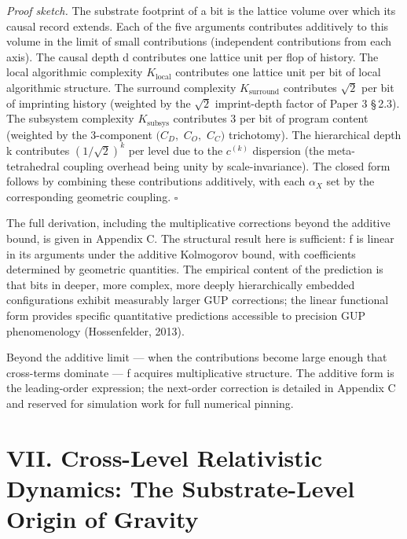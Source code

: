 \documentclass[11pt,oneside]{report}
\theoremstyle{definition}
\theoremstyle{remark}
\begin{document}
\emph{Proof sketch.} The substrate footprint of a bit is the lattice
volume over which its causal record extends. Each of the five arguments
contributes additively to this volume in the limit of small
contributions (independent contributions from each axis). The causal
depth d contributes one lattice unit per flop of history. The local
algorithmic complexity \ensuremath{K_{\mathrm{local}}} contributes one lattice unit per bit of
local algorithmic structure. The surround complexity \ensuremath{K_{\mathrm{surround}}}
contributes \ensuremath{\sqrt{2}} per bit of imprinting history (weighted by the \ensuremath{\sqrt{2}}
imprint-depth factor of Paper 3 \S\,2.3). The subsystem complexity
\ensuremath{K_{\mathrm{subsys}}} contributes 3 per bit of program content (weighted by the
3-component \ensuremath{(C_{D},} \ensuremath{C_{O},} \ensuremath{C_{C})} trichotomy). The hierarchical depth k
contributes \ensuremath{(1/\sqrt{2})^{k}} per level due to the \ensuremath{c^{(k)}} dispersion
(the meta-tetrahedral coupling overhead being unity by scale-invariance). The closed form
follows by combining these contributions additively, with each \ensuremath{\alpha_{X}} set
by the corresponding geometric coupling. \hfill\ensuremath{\square}

The full derivation, including the multiplicative corrections beyond the
additive bound, is given in Appendix C. The structural result here is
sufficient: f is linear in its arguments under the additive Kolmogorov
bound, with coefficients determined by geometric quantities. The
empirical content of the prediction is that bits in deeper, more
complex, more deeply hierarchically embedded configurations exhibit
measurably larger GUP corrections; the linear functional form provides
specific quantitative predictions accessible to precision GUP
phenomenology (Hossenfelder, 2013).

Beyond the additive limit --- when the contributions become large enough
that cross-terms dominate --- f acquires multiplicative structure. The
additive form is the leading-order expression; the next-order correction
is detailed in Appendix C and reserved for simulation work for full
numerical pinning.

\section*{VII. Cross-Level Relativistic Dynamics: The Substrate-Level Origin of Gravity}
\end{document}
